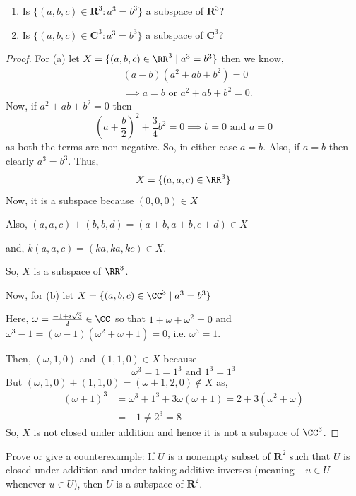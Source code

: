 \begin{exercise}
\begin{enumerate}
\item[(a)] Is $\{(a, b, c) \in \mathbf{R}^3 : a^3 = b^3\}$ a subspace of $\mathbf{R}^3$?
\item[(b)] Is $\{(a, b, c) \in \mathbf{C}^3 : a^3 = b^3\}$ a subspace of $\mathbf{C}^3$?
\end{enumerate}
\end{exercise}

\begin{proof}
For (a) let $X = \{(a,b,c) \in \RR^3 \mid a^3 = b^3\}$ then we know,
\begin{align*}
& (a - b)(a^2 + ab + b^2) = 0 \\
& \implies a = b \text{ or } a^2 + ab + b^2 = 0.
\end{align*}
Now, if $a^2 + ab + b^2 = 0$ then
\[
\left(a + \frac{b}{2}\right)^2 + \frac{3}{4} b^2 = 0 \implies b = 0 \text{ and } a = 0
\]
as both the terms are non-negative. So, in either case $a = b$. Also, if $a = b$ then clearly $a^3 = b^3$. Thus,
\[
X = \{(a,a,c) \in \RR^3\}
\]
Now, it is a subspace because $(0,0,0) \in X$

Also, $(a,a,c) + (b,b,d) = (a+b, a+b, c+d) \in X$

and, $k(a,a,c) = (ka, ka, kc) \in X$.

So, $X$ is a subspace of $\RR^3$.

Now, for (b) let $X = \{(a,b,c) \in \CC^3 \mid a^3 = b^3\}$

Here, $\omega = \frac{-1 + i\sqrt{3}}{2} \in \CC$ so that $1 + \omega + \omega^2 = 0$ and $\omega^3 - 1 = (\omega - 1)(\omega^2 + \omega + 1) = 0$, i.e. $\omega^3 = 1$.

Then, $(\omega, 1, 0)$ and $(1, 1, 0) \in X$ because
\[
\omega^3 = 1 = 1^3 \text{ and } 1^3 = 1^3
\]
But $(\omega, 1, 0) + (1, 1, 0) = (\omega + 1, 2, 0) \notin X$ as,
\begin{align*}
(\omega + 1)^3 &= \omega^3 + 1^3 + 3\omega(\omega + 1) = 2 + 3(\omega^2 + \omega) \\
&= -1 \neq 2^3 = 8
\end{align*}
So, $X$ is not closed under addition and hence it is not a subspace of $\CC^3$.
\end{proof}

\begin{exercise}
Prove or give a counterexample: If $U$ is a nonempty subset of $\mathbf{R}^2$ such that $U$ is closed under addition and under taking additive inverses (meaning $-u \in U$ whenever $u \in U$), then $U$ is a subspace of $\mathbf{R}^2$.
\end{exercise}

